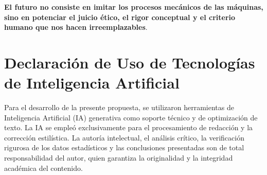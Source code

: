 \documentclass[journal,10pt,twocolumn,letterpaper]{IEEEtran}
\begin{document}
\textbf{El futuro no consiste en imitar los procesos mecánicos de las máquinas, sino en potenciar el juicio ético, el rigor conceptual y el criterio humano que nos hacen irreemplazables}.

\section{Declaración de Uso de Tecnologías de Inteligencia Artificial}
Para el desarrollo de la presente propuesta, se utilizaron herramientas de Inteligencia Artificial (IA) generativa como soporte técnico y de optimización de texto. La IA se empleó exclusivamente para el procesamiento de redacción y la corrección estilística. La autoría intelectual, el análisis crítico, la verificación rigurosa de los datos estadísticos y las conclusiones presentadas son de total responsabilidad del autor, quien garantiza la originalidad y la integridad académica del contenido.
\end{document}
